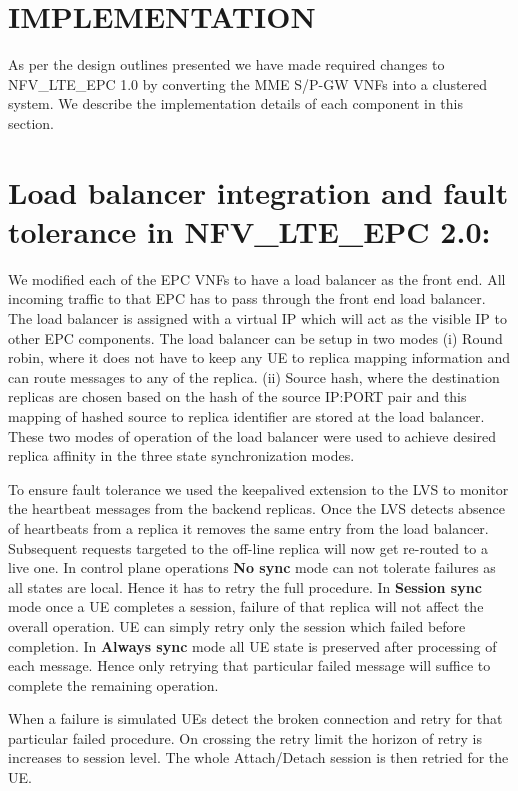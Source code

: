 \documentclass[hidelinks]{report}
\begin{document}
\section*{IMPLEMENTATION}
\label{sec:imp}
As per the design outlines presented we have made required changes to NFV\_LTE\_EPC 1.0 by converting the MME S/P-GW VNFs into a clustered system. We describe the implementation details of each component in this section.

\section*{Load balancer integration and fault tolerance in NFV\_LTE\_EPC 2.0:}

We modified each of the EPC VNFs to have a load balancer as the front end. All incoming traffic to that EPC has to pass through the front end load balancer. The load balancer is assigned with a virtual IP which will act as the visible IP to other EPC components. The load balancer can be setup in two modes (i) Round robin, where it does not have to keep any UE to replica mapping information and can route messages to any of the replica. (ii) Source hash, where the destination replicas are chosen based on the hash of the source IP:PORT pair and this mapping of hashed source to replica identifier are stored at the load balancer. These two modes of operation of the load balancer were used to achieve  desired replica affinity in the three state  synchronization modes. 
\par To ensure fault tolerance we used the keepalived extension to the LVS to monitor the heartbeat messages from the backend replicas. Once the LVS detects absence of heartbeats from a replica it removes the same entry from the load balancer. Subsequent requests targeted to the off-line replica will now get re-routed to a live one. In control plane operations \textbf{No sync} mode can not tolerate failures as all states are local. Hence it has to retry the full procedure. In \textbf{Session sync} mode once a UE completes a session, failure of that replica will not affect the overall operation. UE can simply retry only the session which failed before completion.
In \textbf{Always sync} mode all UE state is preserved after processing of each message. Hence only retrying that particular failed message will suffice to complete the remaining operation.

When a failure is simulated UEs detect the broken connection and retry for that particular failed procedure. On crossing the retry limit the horizon of retry is increases to session level. The whole Attach/Detach session is then retried for the UE. 
\end{document}
